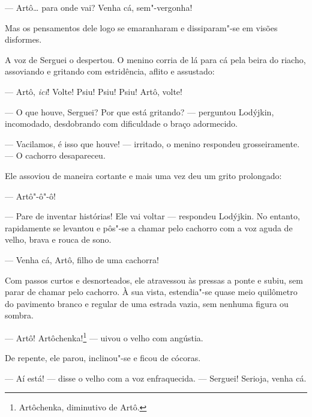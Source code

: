 
--- Artô\ldots{} para onde vai? Venha cá, sem"-vergonha!

Mas os pensamentos dele logo se emaranharam e dissiparam"-se em visões
disformes.

A voz de Serguei o despertou. O menino corria de lá para cá pela beira
do riacho, assoviando e gritando com estridência, aflito e assustado:

--- Artô, \emph{ici}! Volte! Psiu! Psiu! Psiu! Artô, volte!

--- O que houve, Serguei? Por que está gritando? --- perguntou Lodýjkin,
incomodado, desdobrando com dificuldade o braço adormecido.

--- Vacilamos, é isso que houve! --- irritado, o menino respondeu
grosseiramente. --- O cachorro desapareceu.

Ele assoviou de maneira cortante e mais uma vez deu um grito prolongado:

--- Artô"-ô"-ô!

--- Pare de inventar histórias! Ele vai voltar --- respondeu Lodýjkin.
No entanto, rapidamente se levantou e pôs"-se a chamar pelo cachorro com
a voz aguda de velho, brava e rouca de sono.

--- Venha cá, Artô, filho de uma cachorra!

Com passos curtos e desnorteados, ele atravessou às pressas a ponte e
subiu, sem parar de chamar pelo cachorro. À sua vista, estendia"-se quase
meio quilômetro do pavimento branco e regular de uma estrada vazia, sem
nenhuma figura ou sombra.

--- Artô! Artôchenka!\footnote{Artôchenka, diminutivo de Artô.} ---
uivou o velho com angústia.

De repente, ele parou, inclinou"-se e ficou de cócoras.

--- Aí está! --- disse o velho com a voz enfraquecida. --- Serguei!
Serioja, venha cá.


